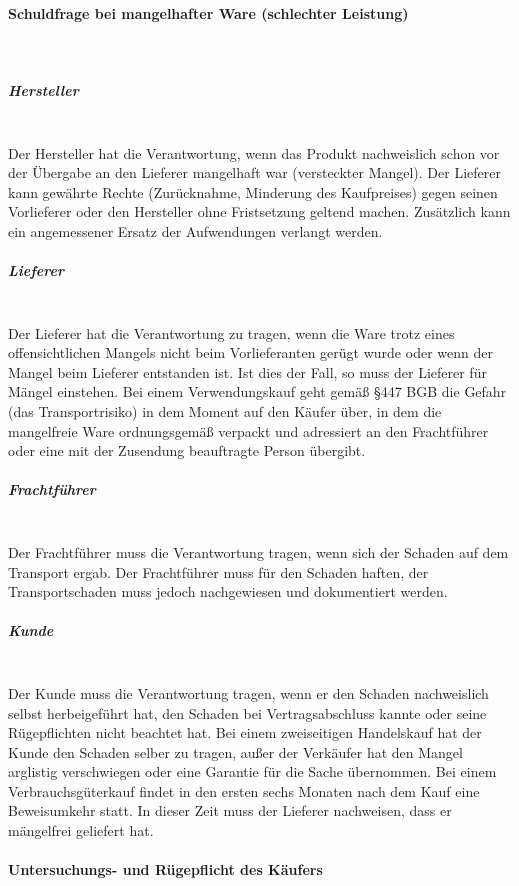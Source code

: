 \paragraph{Schuldfrage bei mangelhafter Ware (schlechter Leistung)}~\\
	
\subparagraph{Hersteller}~\\
Der Hersteller hat die Verantwortung, wenn das Produkt nachweislich schon vor der Übergabe an den Lieferer mangelhaft war (versteckter Mangel). Der Lieferer kann gewährte Rechte (Zurücknahme, Minderung des Kaufpreises) gegen seinen Vorlieferer oder den Hersteller ohne Fristsetzung geltend machen. Zusätzlich kann ein angemessener Ersatz der Aufwendungen verlangt werden.

\subparagraph{Lieferer}~\\
Der Lieferer hat die Verantwortung zu tragen, wenn die Ware trotz eines offensichtlichen Mangels nicht beim Vorlieferanten gerügt wurde oder wenn der Mangel beim Lieferer entstanden ist. Ist dies der Fall, so muss der Lieferer für Mängel einstehen. Bei einem Verwendungskauf geht gemäß §447 BGB die Gefahr (das Transportrisiko) in dem Moment auf den Käufer über, in dem die mangelfreie Ware ordnungsgemäß verpackt und adressiert an den Frachtführer oder eine mit der Zusendung beauftragte Person übergibt.

\subparagraph{Frachtführer}~\\
Der Frachtführer muss die Verantwortung tragen, wenn sich der Schaden auf dem Transport ergab. Der Frachtführer muss für den Schaden haften, der Transportschaden muss jedoch nachgewiesen und dokumentiert werden.

\subparagraph{Kunde}~\\
Der Kunde muss die Verantwortung tragen, wenn er den Schaden nachweislich selbst herbeigeführt hat, den Schaden bei Vertragsabschluss kannte oder seine Rügepflichten nicht beachtet hat. Bei einem zweiseitigen Handelskauf hat der Kunde den Schaden selber zu tragen, außer der Verkäufer hat den Mangel arglistig verschwiegen oder eine Garantie für die Sache übernommen. Bei einem Verbrauchsgüterkauf findet in den ersten sechs Monaten nach dem Kauf eine Beweisumkehr statt. In dieser Zeit muss der Lieferer nachweisen, dass er mängelfrei geliefert hat.
	
\paragraph{Untersuchungs- und Rügepflicht des Käufers}~\\

